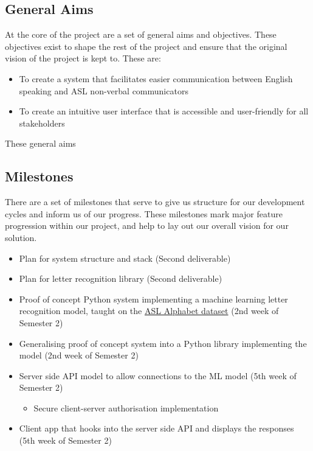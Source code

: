 \documentclass[10pt]{article}
\begin{document}
  \subsection{General Aims}

  At the core of the project are a set of general aims and objectives. These objectives exist to 
  shape the rest of the project and ensure that the original vision of the project is kept to. These 
  are: 

  \begin{itemize}
    \item To create a system that facilitates easier communication between English speaking and ASL 
      non-verbal communicators
    \item To create an intuitive user interface that is accessible and user-friendly for all 
      stakeholders
  \end{itemize}

  These general aims 

  \subsection{Milestones}

  There are a set of milestones that serve to give us structure for our development cycles and 
  inform us of our progress. These milestones mark major feature progression within our project, and 
  help to lay out our overall vision for our solution.

  \begin{itemize}
    \item Plan for system structure and stack (Second deliverable)
    \item Plan for letter recognition library (Second deliverable)
    \item Proof of concept Python system implementing a machine learning letter recognition model, 
      taught on the \href{https://www.kaggle.com/grassknoted/asl-alphabet}{ASL Alphabet dataset}  
      (2nd week of Semester 2)
    \item Generalising proof of concept system into a Python library implementing the model  (2nd 
      week of Semester 2)
    \item Server side API model to allow connections to the ML model (5th week of Semester 2)
    \begin{itemize}
      \item Secure client-server authorisation implementation
    \end{itemize}
    \item Client app that hooks into the server side API and displays the responses (5th week of 
      Semester 2)

  \end{itemize}
\end{document}
